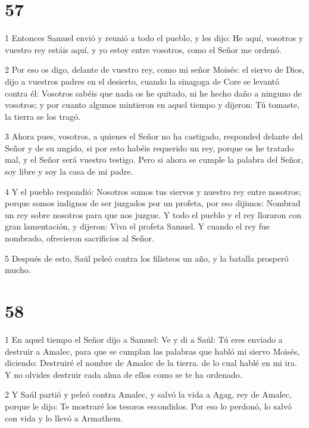 \chapter{57}

\par 1 Entonces Samuel envió y reunió a todo el pueblo, y les dijo: He aquí, vosotros y vuestro rey estáis aquí, y yo estoy entre vosotros, como el Señor me ordenó.

\par 2 Por eso os digo, delante de vuestro rey, como mi señor Moisés: el siervo de Dios, dijo a vuestros padres en el desierto, cuando la sinagoga de Core se levantó contra él: Vosotros sabéis que nada os he quitado, ni he hecho daño a ninguno de vosotros; y por cuanto algunos mintieron en aquel tiempo y dijeron: Tú tomaste, la tierra se los tragó.

\par 3 Ahora pues, vosotros, a quienes el Señor no ha castigado, responded delante del Señor y de su ungido, si por esto habéis requerido un rey, porque os he tratado mal, y el Señor será vuestro testigo. Pero si ahora se cumple la palabra del Señor, soy libre y soy la casa de mi padre.

\par 4 Y el pueblo respondió: Nosotros somos tus siervos y nuestro rey entre nosotros; porque somos indignos de ser juzgados por un profeta, por eso dijimos: Nombrad un rey sobre nosotros para que nos juzgue. Y todo el pueblo y el rey lloraron con gran lamentación, y dijeron: Viva el profeta Samuel. Y cuando el rey fue nombrado, ofrecieron sacrificios al Señor.

\par 5 Después de esto, Saúl peleó contra los filisteos un año, y la batalla prosperó mucho.

\chapter{58}

\par 1 En aquel tiempo el Señor dijo a Samuel: Ve y di a Saúl: Tú eres enviado a destruir a Amalec, para que se cumplan las palabras que habló mi siervo Moisés, diciendo: Destruiré el nombre de Amalec de la tierra. de lo cual hablé en mi ira. Y no olvides destruir cada alma de ellos como se te ha ordenado.

\par 2 Y Saúl partió y peleó contra Amalec, y salvó la vida a Agag, rey de Amalec, porque le dijo: Te mostraré los tesoros escondidos. Por eso lo perdonó, lo salvó con vida y lo llevó a Armathem.

